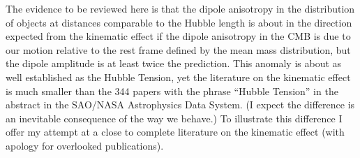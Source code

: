 \documentclass[fleqn,12pt]{article}
\begin{document}
The evidence to be reviewed here is that the dipole anisotropy in the distribution of objects at distances comparable to the Hubble length is about in the direction expected from the kinematic effect if the dipole anisotropy in the CMB is due to our motion relative to the rest frame defined by the mean mass distribution, but the dipole amplitude is at least twice the prediction. This anomaly is about as well established as the Hubble Tension, yet the  literature on the kinematic effect is much smaller than the 344 papers with the phrase ``Hubble Tension'' in the abstract in the SAO/NASA Astrophysics Data System. (I expect the difference is an inevitable consequence of the way we behave.) To illustrate this difference I offer my attempt at a close to complete literature on the kinematic effect (with apology for overlooked publications). 
\end{document}
